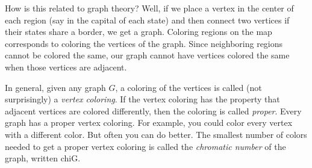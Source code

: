 \documentclass[12pt]{article}
\begin{document}
How is this related to graph theory?  Well, if we place a vertex in the center of each region (say in the capital of each state) and then connect two vertices if their states share a border, we get a graph.  Coloring regions on the map corresponds to coloring the vertices of the graph.  Since neighboring regions cannot be colored the same, our graph cannot have vertices colored the same when those vertices are adjacent.

In general, given any graph $G$, a coloring of the vertices is called (not surprisingly) a \emph{vertex coloring}.  If the vertex coloring has the property that adjacent vertices are colored differently, then the coloring is called \emph{proper}.  Every graph has a proper vertex coloring.  For example, you could color every vertex with a different color.  But often you can do better.  The smallest number of colors needed to get a proper vertex coloring is called the \emph{chromatic number} of the graph, written \gls{chiG}.
\end{document}

